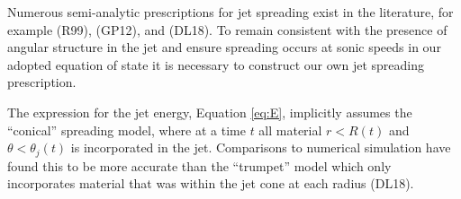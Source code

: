 \documentclass[twocolumn]{aastex62}
\begin{document}
Numerous semi-analytic prescriptions for jet spreading exist in the literature, for example \citet{Rhoads:1999aa} (R99), \citet{Granot:2012aa} (GP12), and \citet{Duffell:2018aa} (DL18).  To remain consistent with the presence of angular structure in the jet and ensure spreading occurs at sonic speeds in our adopted equation of state it is necessary to construct our own jet spreading prescription.  

The expression for the jet energy, Equation \eqref{eq:E}, implicitly assumes the ``conical'' spreading model, where at a time $t$ all material $r < R(t)$ and $\theta < \theta_j(t)$ is incorporated in the jet.  Comparisons to numerical simulation have found this to be more accurate than the ``trumpet'' model which only incorporates material that was within the jet cone at each radius (DL18).
\end{document}
